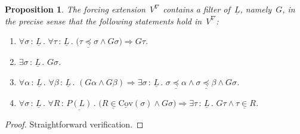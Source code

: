 \documentclass[com,11pt,crcready]{iosart2x}
\theoremstyle{definition}
\theoremstyle{plain}
\newtheorem{proposition}[definition]{Proposition}
\theoremstyle{remark}
\newcommand{\?}{\,{:}\,}
\newcommand{\Cov}{\mathrm{Cov}}
\renewcommand{\_}{\mathpunct{.}\,}
\begin{document}
\begin{proposition}The forcing extension~$V^\nabla$ contains a filter
of~$\underline{L}$, namely~$G$, in the precise sense that the following
statements hold in~$V^\nabla$:
\begin{enumerate}
\item[(1)] $\forall \sigma \? \underline{L}\_ \forall \tau \? \underline{L}\_
\bigl(\tau \mathrel{\underline{\preccurlyeq}} \sigma \wedge G\sigma\bigr)
\Rightarrow G\tau$.
\item[(2a)] $\exists \sigma \? \underline{L}\_ G\sigma$.
\item[(2b)] $\forall \alpha \? \underline{L}\_
\forall \beta \? \underline{L}\_
(G\alpha \wedge G\beta) \Rightarrow
\exists \sigma \? \underline{L}\_
\sigma \mathrel{\underline{\preccurlyeq}} \alpha \wedge
\sigma \mathrel{\underline{\preccurlyeq}} \beta \wedge
G\sigma$.
\item[(3)] $\forall \sigma \? \underline{L}\_
\forall R \? \underline{P(L)}\_
\bigl(R \mathrel{\underline{\in}} \underline{\Cov}(\sigma) \wedge
G\sigma\bigr) \Rightarrow
\exists \tau \? \underline{L}\_
G\tau \wedge \tau \mathrel{\underline{\in}} R$.
\end{enumerate}
\end{proposition}

\begin{proof}Straightforward verification.
\end{proof}
\end{document}
